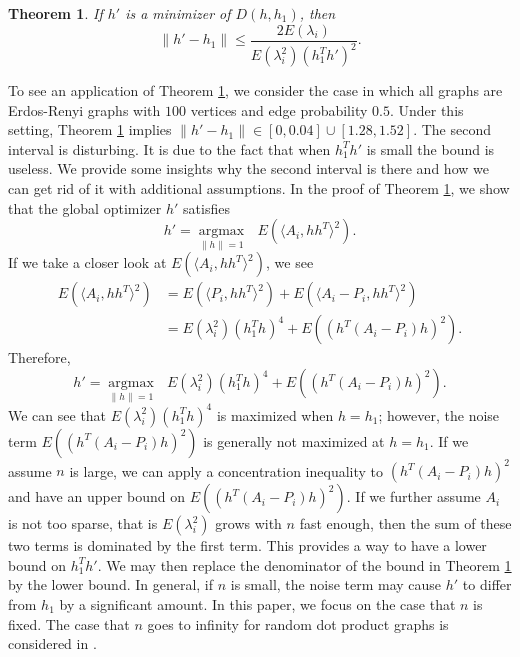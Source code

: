 \documentclass[10pt,journal,compsoc]{IEEEtran}
\newtheorem{theorem}{Theorem}[section]
\begin{document}
\begin{theorem}
\label{thm:2}
If $h'$ is a minimizer of $D(h,h_1)$, then 
\[\|h'-h_1\| \leq \frac{2 E(\lambda_i)}{E(\lambda_i^2)(h_1^T h')^2}. \]
\end{theorem}

\noindent	To see an application of Theorem \ref{thm:2}, we consider the case in which all graphs are Erdos-Renyi graphs with $100$ vertices and edge probability $0.5$. Under this setting, Theorem \ref{thm:2} implies  $\|h'-h_1\| \in [0,0.04] \cup [1.28,1.52]$. The second interval is disturbing. It is due to the fact that when $h_1^T h'$ is small the bound is useless. We provide some insights why the second interval is there and how we can get rid of it with additional assumptions. In the proof of Theorem \ref{thm:2}, we show that the global optimizer $h'$ satisfies
\[h'= \underset{\|h\| =1}{\operatorname{argmax}} \text{ } E(\langle A_i,h h^T \rangle ^2). \]
If we take a closer look at $E(\langle A_i,h h^T \rangle ^2)$, we see
\begin{align*}
	E(\langle A_i,h h^T \rangle ^2) &= E(\langle P_i,h h^T \rangle ^2)+E(\langle A_i-P_i,h h^T \rangle ^2) \\
	&=E(\lambda_i^2)(h_1^T h)^4+E((h^T (A_i-P_i)h) ^2).
\end{align*}
Therefore, 
\[h'= \underset{\|h\| =1}{\operatorname{argmax}} \text{ } E(\lambda_i^2)(h_1^T h)^4+E((h^T (A_i-P_i)h) ^2) .\]
We can see that $E(\lambda_i^2)(h_1^T h)^4$ is maximized when $h=h_1$; however, the noise term $E((h^T (A_i-P_i)h) ^2)$ is generally not maximized at $h=h_1$. If we assume $n$ is large, we can apply a concentration inequality to $(h^T (A_i-P_i)h) ^2$ and have an upper bound on $E((h^T (A_i-P_i)h) ^2)$. If we further assume $A_i$ is not too sparse, that is $E(\lambda_i^2)$ grows with $n$ fast enough, then the sum of these two terms is dominated by the first term. This provides a way to have a lower bound on $h_1^T h'$. We may then replace the denominator of the bound in Theorem \ref{thm:2} by the lower bound. In general, if $n$ is small, the noise term may cause $h'$ to differ from $h_1$ by a significant amount. In this paper, we focus on the case that $n$ is fixed. The case that $n$ goes to infinity for random dot product graphs is considered in \cite{athreya2013limit}.\\
\end{document}
